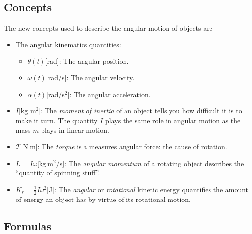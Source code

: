\documentclass[letterpaper,9pt,journal]{IEEEtran}
\begin{document}
\vspace{-3mm}
\subsection{Concepts}

The new concepts used to describe the angular motion of objects are
\begin{itemize}
\item  The angular kinematics quantities:
\begin{itemize}
\item  $\theta(t)$[rad]: The angular position.
\item  $\omega(t)$[rad/s]: The angular velocity. 
\item  $\alpha(t)$[rad/s$^2$]: The angular acceleration.
\end{itemize}

\item  $I$[kg m$^2$]: The \emph{moment of inertia} of an object tells you how difficult it is to make it turn.  The quantity $I$ plays the same role in angular motion as the mass $m$ plays in linear motion.
\item  $\mathcal{T}$[N$\:$m]: The \emph{torque} is a measures angular force: the cause of rotation.
\item  $L=I\omega$[kg$\:$m$^2$/s]: The \emph{angular momentum} of a rotating object describes the ``quantity of spinning stuff''.
\item  $K_r=\frac{1}{2}I\omega^2$[J]: The \emph{angular} or \emph{rotational} kinetic energy  quantifies the amount of energy an object has by virtue of its rotational motion.
\end{itemize}

\vspace{-3mm}
\subsection{Formulas}

\end{document}
